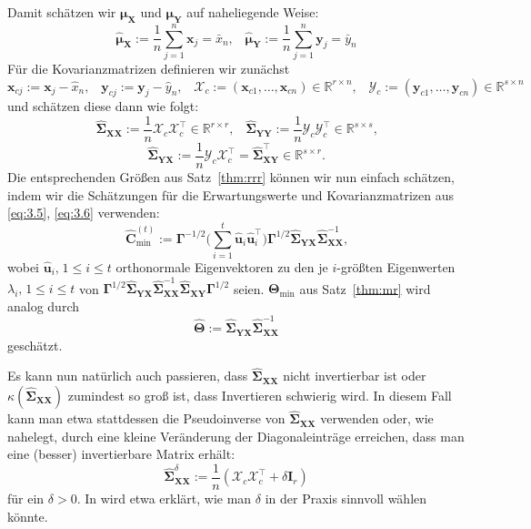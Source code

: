 \documentclass[]{article}
\newcommand{\R}{\mathbb{R}}
\newcommand{\X}{\mathbf{X}}
\newcommand{\Y}{\mathbf{Y}}
\newcommand{\T}{\mathbf{\Theta}}
\newcommand{\muu}{\bm{\mu}}
\newcommand{\Ssigma}{\mathbf{\Sigma}}
\newcommand{\uu}{\mathbf{u}}
\newcommand{\C}{\mathbf{C}}
\newcommand{\Ggamma}{\mathbf{\Gamma}}
\newcommand{\xx}{\mathbf{x}}
\newcommand{\yy}{\mathbf{y}}
\newcommand{\XX}{\mathcal{X}}
\newcommand{\YY}{\mathcal{Y}}
\begin{document}
Damit schätzen wir $\muu_\X$ und $\muu_\Y$ auf naheliegende Weise:
\[\widehat{\muu}_{\X} := \frac{1}{n} \sum_{j=1}^{n} \mathbf{x}_j = \bar{x}_n \text{,} \quad \widehat{\muu}_{\Y} := \frac{1}{n} \sum_{j=1}^{n} \mathbf{y}_j = \bar{y}_n \label{eq:3.5} \tag{3.5}\]
Für die Kovarianzmatrizen definieren wir zunächst
$$\xx_{cj} := \xx_j - \hat{x}_n \text{,} \quad \yy_{cj} := \yy_j - \hat{y}_n \text{,} \quad \XX_c := (\xx_{c1},\dots,\xx_{cn}) \in \R^{r \times n} \text{,} \quad \YY_c := (\yy_{c1},\dots,\yy_{cn}) \in \R^{s \times n}$$
und schätzen diese dann wie folgt:
$$ \widehat{\Ssigma}_{\X\X} := \frac{1}{n} \XX_c \XX_c^\top \in \R^{r \times r} \text{,} \quad \widehat{\Ssigma}_{\Y\Y} := \frac{1}{n} \YY_c \YY_c^\top \in \R^{s \times s} \text{,}$$
\[\widehat{\Ssigma}_{\Y\X} := \frac{1}{n} \YY_c \XX_c^\top = \widehat{\Ssigma}_{\X\Y}^\top \in \R^{s \times r} \text{.}\label{eq:3.6} \tag{3.6}\]
Die entsprechenden Größen aus Satz~\ref{thm:rrr} können wir nun einfach schätzen, indem wir die Schätzungen für die Erwartungswerte und Kovarianzmatrizen aus \eqref{eq:3.5}, \eqref{eq:3.6} verwenden:
$$\widehat{\C}^{(t)}_{\min} := \Ggamma^{-1/2} \biggl( \sum_{i=1}^{t} \widehat{\uu}_i \widehat{\uu}_i^\top \biggr) \Ggamma^{1/2} \widehat{\Ssigma}_{\Y\X} \widehat{\Ssigma}_{\X\X}^{-1} \text{,}$$
wobei $\widehat{\uu}_i\text{,} \; 1 \leq i \leq t$ orthonormale Eigenvektoren zu den je $i$-größten Eigenwerten $\lambda_i \text{,} \; 1 \leq i \leq t$ von
$\Ggamma^{1/2} \widehat{\Ssigma}_{\Y\X} \widehat{\Ssigma}_{\X\X}^{-1} \widehat{\Ssigma}_{\X\Y} \Ggamma^{1/2}$ seien. $\T_{\min}$ aus Satz~\ref{thm:mr} wird analog durch
$$\widehat{\T} := \widehat{\Ssigma}_{\Y\X} \widehat{\Ssigma}_{\X\X}^{-1}$$
geschätzt.

Es kann nun natürlich auch passieren, dass $\widehat{\Ssigma}_{\X\X}$ nicht invertierbar ist oder $\kappa(\widehat{\Ssigma}_{\X\X})$ zumindest so groß ist, dass Invertieren schwierig wird. In diesem Fall kann man etwa stattdessen die Pseudoinverse von $\widehat{\Ssigma}_{\X\X}$ verwenden oder, wie \cite[Seite 182]{Iz08} nahelegt, durch eine kleine Veränderung der Diagonaleinträge erreichen, dass man eine (besser) invertierbare Matrix erhält:
$$\widehat{\Ssigma}_{\X\X}^{\delta} := \frac{1}{n}(\XX_c \XX_{c}^\top + \delta \mathbf{I}_r)$$
für ein $\delta > 0$. In \cite[Kapitel 6.3.4]{Iz08} wird etwa erklärt, wie man $\delta$ in der Praxis sinnvoll wählen könnte.
\end{document}
